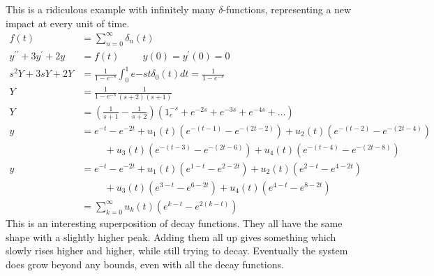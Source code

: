 \documentclass[fleqn,letterpaper]{report}
\begin{document}
\begin{example}
This is a ridiculous example with infinitely many
$\delta$-functions, representing a new impact at every unit of
time.
\begin{align*}
f(t) & = \sum_{n=0}^\infty \delta_n (t) \\
y^{\prime \prime} + 3 y^\prime + 2y & = f(t) \hspace{1cm} y(0) =
y^\prime(0) = 0 \\
s^2 Y + 3sY + 2Y & = \frac{1}{1-e^{-s}} \int_0^1 e{-st} \delta_0
(t) dt = \frac{1}{1-e^{-s}} \\
Y & = \frac{1}{1-e^{-s}} \frac{1}{(s+2)(s+1)} \\
Y & = \left( \frac{1}{s+1} - \frac{1}{s+2} \right) \left( 1 _
e^{-s} + e^{-2s} + e^{-3s} + e^{-4s} + \ldots \right) \\
y & = e^{-t} - e^{-2t} 
+ u_1(t) \left( e^{-(t-1)} - e^{-(2t-2)} \right) 
+ u_2(t) \left( e^{-(t-2)} - e^{-(2t-4)} \right) \\
& \hspace{1cm} + u_3(t) \left( e^{-(t-3)} - e^{-(2t-6)} \right) 
+ u_4(t) \left( e^{-(t-4)} - e^{-(2t-8)} \right) \\
y & = e^{-t} - e^{-2t} 
+ u_1(t) \left( e^{1-t} - e^{2-2t} \right) 
+ u_2(t) \left( e^{2-t} - e^{4-2t} \right) \\
& \hspace{1cm} + u_3(t) \left( e^{3-t} - e^{6-2t} \right) 
+ u_4(t) \left( e^{4-t} - e^{8-2t} \right) \\
& = \sum_{k=0}^\infty u_k(t) \left( e^{k-t} - e^{2(k-t)}
\right)
\end{align*}
This is an interesting superposition of decay functions. They
all have the same shape with a slightly higher peak. Adding
them all up gives something which slowly rises higher and
higher, while still trying to decay. Eventually the system
does grow beyond any bounds, even with all the decay
functions.
\end{example}
\end{document}
